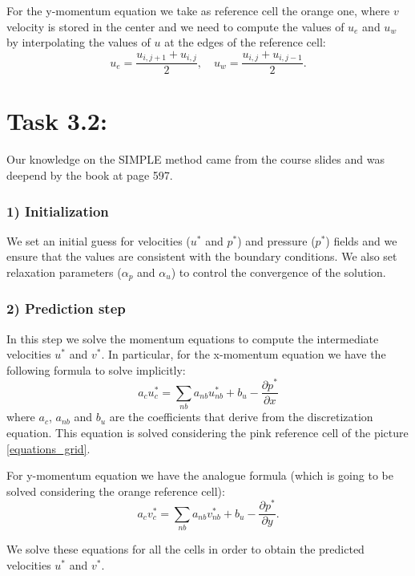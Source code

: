 \documentclass{article}
\begin{document}
For the y-momentum equation we take as reference cell the orange one, where $v$ velocity is stored in the center and we need to compute the values of $u_e$ and $u_w$ by interpolating the values of $u$ at the edges of the reference cell:
\begin{equation*}
  u_e = \frac{u_{i,j+1} + u_{i,j}}{2}, \quad u_w = \frac{u_{i,j} + u_{i,j-1}}{2}.
\end{equation*}
  

\newpage
\section*{\Large Task 3.2:}
Our knowledge on the SIMPLE method came from the course slides and was deepend by the book \cite{Book} at page 597.
\subsubsection*{1) Initialization}
We set an initial guess for velocities ($u^*$ and $p^*$) and pressure ($p^*$) fields and we ensure that the values are consistent with the boundary conditions.
We also set relaxation parameters ($\alpha_p$ and $\alpha_u$) to control the convergence of the solution.

\subsubsection*{2) Prediction step}
In this step we solve the momentum equations to compute the intermediate velocities $u^*$ and $v^*$.
In particular, for the x-momentum equation we have the following formula to solve implicitly:
\begin{equation}
  a_{c}u_{c}^*=\sum_{nb}a_{nb}u_{nb}^*+b_{u}-\frac{\partial p^{*}}{\partial x}
\end{equation}
where $a_{c}$, $a_{nb}$ and $b_{u}$ are the coefficients that derive from the discretization equation.
This equation is solved considering the pink reference cell of the picture \ref{equations_grid}.

For y-momentum equation we have the analogue formula (which is going to be solved considering the orange reference cell):
\begin{equation}
  a_{c}v_{c}^*=\sum_{nb}a_{nb}v_{nb}^*+b_{u}-\frac{\partial p^{*}}{\partial y}.
\end{equation}

We solve these equations for all the cells in order to obtain the predicted velocities $u^*$ and $v^*$.
\end{document}
